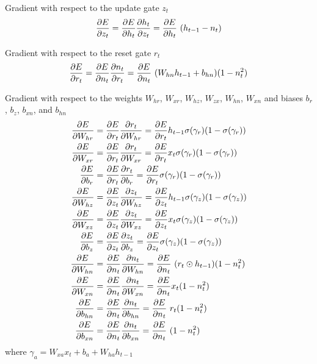 Gradient with respect to the update gate $z_t$
\newcommand{\pdvEzt}{\pdv{E}{h_t}~(h_{t-1} - n_t)}
\begin{equation}
    \pdv{E}{z_t} = \pdv{E}{h_t} \pdv{h_t}{z_t} = \pdvEzt
\end{equation}

Gradient with respect to the reset gate $r_t$
\newcommand{\pdvErt}{\pdvEnt~(W_{hn}h_{t-1}+b_{hn})(1-n_t^2)}
\begin{equation}
    \pdv{E}{r_t} = \pdv{E}{n_t} \pdv{n_t}{r_t} = \pdvErt
\end{equation}

Gradient with respect to the weights $W_{hr}$, $W_{xr}$, $W_{hz}$, $W_{zx}$, $W_{hn}$, $W_{xn}$ and biases $b_{r}$,  $b_{z}$, $b_{xn}$, and $b_{hn}$
\renewcommand{\pdvErt}{\pdv{E}{r_t}}
\renewcommand{\pdvEzt}{\pdv{E}{z_t}}
\renewcommand{\pdvEnt}{\pdv{E}{n_t}}
\begin{align}
    \begin{split}
        \pdv{E}{W_{hr}} &= \pdv{E}{r_t}\pdv{r_t}{W_{hr}} =  \pdvErt h_{t-1} \pdvsigmoid{\gamma_r}\\
        \pdv{E}{W_{xr}} &= \pdv{E}{r_t}\pdv{r_t}{W_{xr}} =  \pdvErt x_t \pdvsigmoid{\gamma_r}\\
        \pdv{E}{b_{r}} &= \pdv{E}{r_t}\pdv{r_t}{b_{r}} =  \pdvErt \pdvsigmoid{\gamma_r}\\
        \pdv{E}{W_{hz}} &= \pdv{E}{z_t}\pdv{z_t}{W_{hz}} = \pdvEzt h_{t-1} \pdvsigmoid{\gamma_z}\\
        \pdv{E}{W_{xz}} &= \pdv{E}{z_t}\pdv{z_t}{W_{xz}} = \pdvEzt x_t \pdvsigmoid{\gamma_z}\\
        \pdv{E}{b_{z}} &= \pdv{E}{z_t}\pdv{z_t}{b_{z}} = \pdvEzt \pdvsigmoid{\gamma_z}\\
        \pdv{E}{W_{hn}} &= \pdv{E}{n_t}\pdv{n_t}{W_{hn}} = \pdvEnt~(r_t \odot h_{t-1}) (1-n_t^2)  \\
        \pdv{E}{W_{xn}} &= \pdv{E}{n_t}\pdv{n_t}{W_{xn}} = \pdvEnt x_t (1-n_t^2)\\
        \pdv{E}{b_{hn}} &= \pdv{E}{n_t}\pdv{n_t}{b_{hn}} = \pdvEnt~r_t (1-n_t^2)\\
        \pdv{E}{b_{xn}} &= \pdv{E}{n_t}\pdv{n_t}{b_{xn}} = \pdvEnt~(1-n_t^2)\\
    \end{split}
\end{align}
where $\gamma_a = W_{xa}x_t + b_{a} + W_{ha}h_{t-1}$

